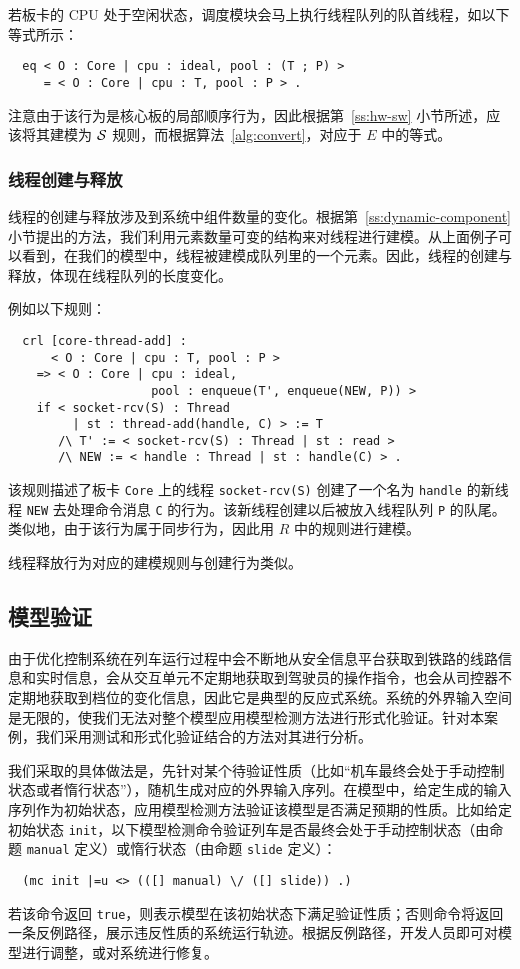 若板卡的 CPU 处于空闲状态，调度模块会马上执行线程队列的队首线程，如以下等式所示：
\begin{verbatim}
  eq < O : Core | cpu : ideal, pool : (T ; P) > 
     = < O : Core | cpu : T, pool : P > .
\end{verbatim}
注意由于该行为是核心板的局部顺序行为，因此根据第~\ref{ss:hw-sw} 小节所述，应该将其建模为 $\mathcal{S}$ 规则，而根据算法~\ref{alg:convert}，对应于 $E$ 中的等式。


\subsubsection{线程创建与释放}

线程的创建与释放涉及到系统中组件数量的变化。根据第~\ref{ss:dynamic-component} 小节提出的方法，我们利用元素数量可变的结构来对线程进行建模。从上面例子可以看到，在我们的模型中，线程被建模成队列里的一个元素。因此，线程的创建与释放，体现在线程队列的长度变化。

例如以下规则：
\begin{verbatim}
  crl [core-thread-add] :
      < O : Core | cpu : T, pool : P >
    => < O : Core | cpu : ideal, 
                    pool : enqueue(T', enqueue(NEW, P)) >
    if < socket-rcv(S) : Thread 
         | st : thread-add(handle, C) > := T
       /\ T' := < socket-rcv(S) : Thread | st : read >
       /\ NEW := < handle : Thread | st : handle(C) > . 
\end{verbatim}
该规则描述了板卡 \verb|Core| 上的线程 \verb|socket-rcv(S)| 创建了一个名为 \verb|handle| 的新线程 \verb|NEW| 去处理命令消息 \verb|C| 的行为。该新线程创建以后被放入线程队列 \verb|P| 的队尾。类似地，由于该行为属于同步行为，因此用 $R$ 中的规则进行建模。

线程释放行为对应的建模规则与创建行为类似。

\subsection{模型验证}

由于优化控制系统在列车运行过程中会不断地从安全信息平台获取到铁路的线路信息和实时信息，会从交互单元不定期地获取到驾驶员的操作指令，也会从司控器不定期地获取到档位的变化信息，因此它是典型的反应式系统。系统的外界输入空间是无限的，使我们无法对整个模型应用模型检测方法进行形式化验证。针对本案例，我们采用测试和形式化验证结合的方法对其进行分析。

我们采取的具体做法是，先针对某个待验证性质（比如“机车最终会处于手动控制状态或者惰行状态”），随机生成对应的外界输入序列。在模型中，给定生成的输入序列作为初始状态，应用模型检测方法验证该模型是否满足预期的性质。比如给定初始状态 \verb|init|，以下模型检测命令验证列车是否最终会处于手动控制状态（由命题 \verb|manual| 定义）或惰行状态（由命题 \verb|slide| 定义）：
\begin{verbatim}
  (mc init |=u <> (([] manual) \/ ([] slide)) .)
\end{verbatim}
若该命令返回 \verb|true|，则表示模型在该初始状态下满足验证性质；否则命令将返回一条反例路径，展示违反性质的系统运行轨迹。根据反例路径，开发人员即可对模型进行调整，或对系统进行修复。


